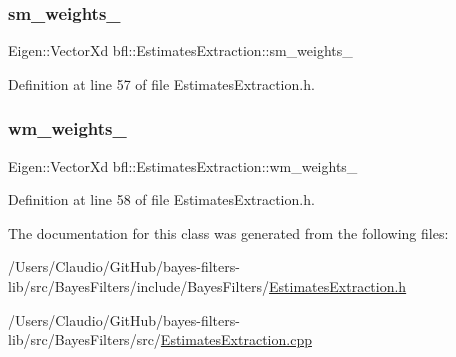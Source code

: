 \subsubsection{\texorpdfstring{sm\+\_\+weights\+\_\+}{sm\_weights\_}}
{\footnotesize\ttfamily Eigen\+::\+Vector\+Xd bfl\+::\+Estimates\+Extraction\+::sm\+\_\+weights\+\_\+\hspace{0.3cm}{\ttfamily [protected]}}



Definition at line 57 of file Estimates\+Extraction.\+h.

\mbox{\label{classbfl_1_1EstimatesExtraction_aeeea600b8591d00e0c15939a0684b77a}} 
\subsubsection{\texorpdfstring{wm\+\_\+weights\+\_\+}{wm\_weights\_}}
{\footnotesize\ttfamily Eigen\+::\+Vector\+Xd bfl\+::\+Estimates\+Extraction\+::wm\+\_\+weights\+\_\+\hspace{0.3cm}{\ttfamily [protected]}}



Definition at line 58 of file Estimates\+Extraction.\+h.



The documentation for this class was generated from the following files\+:\begin{DoxyCompactItemize}
\item 
/\+Users/\+Claudio/\+Git\+Hub/bayes-\/filters-\/lib/src/\+Bayes\+Filters/include/\+Bayes\+Filters/\mbox{\hyperlink{EstimatesExtraction_8h}{Estimates\+Extraction.\+h}}\item 
/\+Users/\+Claudio/\+Git\+Hub/bayes-\/filters-\/lib/src/\+Bayes\+Filters/src/\mbox{\hyperlink{EstimatesExtraction_8cpp}{Estimates\+Extraction.\+cpp}}\end{DoxyCompactItemize}
